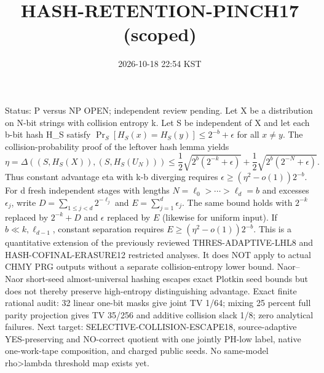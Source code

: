 \documentclass{article}
\title{HASH-RETENTION-PINCH17 (scoped)}
\date{2026-10-18 22:54 KST}
\begin{document}
\maketitle
\noindent Status: P versus NP OPEN; independent review pending.
Let X be a distribution on N-bit strings with collision entropy k.
Let S be independent of X and let each b-bit hash H_S satisfy
$\Pr_S[H_S(x)=H_S(y)]\le 2^{-b}+\epsilon$ for all $x\ne y$.
The collision-probability proof of the leftover hash lemma yields
\[
\eta=\Delta((S,H_S(X)),(S,H_S(U_N)))
\le\frac12\sqrt{2^b(2^{-k}+\epsilon)}
+\frac12\sqrt{2^b(2^{-N}+\epsilon)}.
\]
Thus constant advantage eta with k-b diverging requires
$\epsilon\ge(\eta^2-o(1))2^{-b}$.
For d fresh independent stages with lengths
$N=\ell_0>\cdots>\ell_d=b$ and excesses $\epsilon_j$,
write $D=\sum_{1\le j<d}2^{-\ell_j}$ and $E=\sum_{j=1}^d\epsilon_j$.
The same bound holds with $2^{-k}$ replaced by $2^{-k}+D$
and $\epsilon$ replaced by $E$ (likewise for uniform input).
If $b\ll k,\ell_{d-1}$, constant separation requires
$E\ge(\eta^2-o(1))2^{-b}$.
This is a quantitative extension of the previously reviewed
THRES-ADAPTIVE-LHL8 and HASH-COFINAL-ERASURE12 restricted analyses.
It does NOT apply to actual CHMY PRG outputs without a separate
collision-entropy lower bound. Naor--Naor short-seed almost-universal
hashing escapes exact Plotkin seed bounds but does not thereby
preserve high-entropy distinguishing advantage.
Exact finite rational audit: 32 linear one-bit masks give joint TV
1/64; mixing 25 percent full parity projection gives TV 35/256
and additive collision slack 1/8; zero analytical failures.
Next target: SELECTIVE-COLLISION-ESCAPE18, source-adaptive
YES-preserving and NO-correct quotient with one jointly PH-low label,
native one-work-tape composition, and charged public seeds.
No same-model rho>lambda threshold map exists yet.
\end{document}
